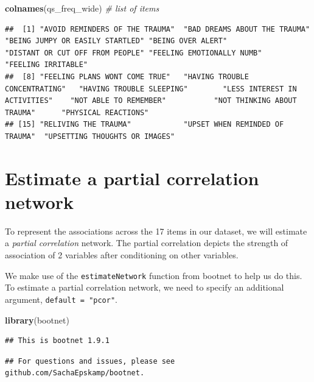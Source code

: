 \documentclass[
]{book}
\newenvironment{Shaded}{\begin{snugshade}}{\end{snugshade}}
\newcommand{\CommentTok}[1]{\textcolor[rgb]{0.56,0.35,0.01}{\textit{#1}}}
\newcommand{\FunctionTok}[1]{\textcolor[rgb]{0.13,0.29,0.53}{\textbf{#1}}}
\newcommand{\NormalTok}[1]{#1}
\begin{document}
\begin{Shaded}
\begin{Highlighting}[]
\FunctionTok{colnames}\NormalTok{(qs\_freq\_wide) }\CommentTok{\# list of items }
\end{Highlighting}
\end{Shaded}

\begin{verbatim}
##  [1] "AVOID REMINDERS OF THE TRAUMA"  "BAD DREAMS ABOUT THE TRAUMA"    "BEING JUMPY OR EASILY STARTLED" "BEING OVER ALERT"               "DISTANT OR CUT OFF FROM PEOPLE" "FEELING EMOTIONALLY NUMB"       "FEELING IRRITABLE"             
##  [8] "FEELING PLANS WONT COME TRUE"   "HAVING TROUBLE CONCENTRATING"   "HAVING TROUBLE SLEEPING"        "LESS INTEREST IN ACTIVITIES"    "NOT ABLE TO REMEMBER"           "NOT THINKING ABOUT TRAUMA"      "PHYSICAL REACTIONS"            
## [15] "RELIVING THE TRAUMA"            "UPSET WHEN REMINDED OF TRAUMA"  "UPSETTING THOUGHTS OR IMAGES"
\end{verbatim}

\section{Estimate a partial correlation network}\label{estimate-a-partial-correlation-network}

To represent the associations across the 17 items in our dataset, we will estimate a \emph{partial correlation} network. The partial correlation depicts the strength of association of 2 variables after conditioning on other variables.

We make use of the \texttt{estimateNetwork} function from bootnet to help us do this. To estimate a partial correlation network, we need to specify an additional argument, \texttt{default\ =\ "pcor"}.

\begin{Shaded}
\begin{Highlighting}[]
\FunctionTok{library}\NormalTok{(bootnet)}
\end{Highlighting}
\end{Shaded}

\begin{verbatim}
## This is bootnet 1.9.1
\end{verbatim}

\begin{verbatim}
## For questions and issues, please see github.com/SachaEpskamp/bootnet.
\end{verbatim}
\end{document}

